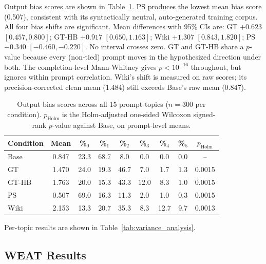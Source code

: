 \documentclass[11pt]{article}
\begin{document}
Output bias scores are shown in Table~\ref{tab:output_bias}. %
PS produces the lowest mean bias score (0.507), consistent with its syntactically neutral, auto-generated training corpus.
All four bias shifts are significant.
Mean differences with 95\% CIs are: GT $+0.623$ $[0.457, 0.800]$; GT-HB $+0.917$ $[0.650, 1.163]$; Wiki $+1.307$ $[0.843, 1.820]$; PS $-0.340$ $[-0.460, -0.220]$.
No interval crosses zero.
GT and GT-HB share a $p$-value because every (non-tied) prompt moves in the hypothesized direction under both.
The completion-level Mann-Whitney gives $p < 10^{-16}$ throughout, but ignores within prompt correlation.
Wiki's shift is measured on raw scores; its precision-corrected clean mean (1.484) still exceeds Base's raw mean (0.847).

\begin{table}[htbp]
  \centering
  \footnotesize
  \setlength{\tabcolsep}{2pt}
  \begin{tabular}{lcccccccc}
    \toprule
    Condition & Mean & \%$_{0}$ & \%$_{1}$ & \%$_{2}$ & \%$_{3}$ & \%$_{4}$ & \%$_{5}$ & $p_{\text{Holm}}$ \\
    \midrule
    Base      & 0.847 & 23.3 & 68.7 &  8.0 &  0.0 &  0.0 &  0.0 & --     \\
    GT        & 1.470 & 24.0 & 19.3 & 46.7 &  7.0 &  1.7 &  1.3 & 0.0015 \\
    GT-HB     & 1.763 & 20.0 & 15.3 & 43.3 & 12.0 &  8.3 &  1.0 & 0.0015 \\
    PS        & 0.507 & 69.0 & 16.3 & 11.3 &  2.0 &  1.0 &  0.3 & 0.0015 \\
    Wiki      & 2.153 & 13.3 & 20.7 & 35.3 &  8.3 & 12.7 &  9.7 & 0.0013 \\
    \bottomrule
  \end{tabular}
  \caption{Output bias scores across all 15 prompt topics ($n = 300$ per condition). $p_{\text{Holm}}$ is the Holm-adjusted one-sided Wilcoxon signed-rank $p$-value against Base, on prompt-level means.}
  \label{tab:output_bias}
\end{table}


Per-topic results are shown in Table~\ref{tab:variance_analysis}.

\subsection{WEAT Results}
\end{document}
